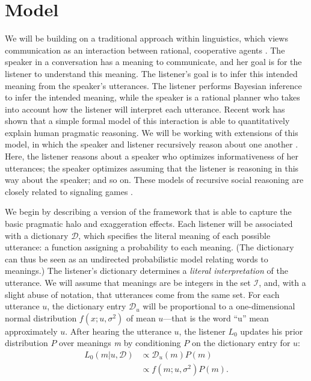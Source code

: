 \documentclass{article} %
\newcommand{\dictionary}{\ensuremath{\mathcal{D}}\xspace}
\begin{document}

\section{Model}

We will be building on a traditional approach within linguistics, which views communication as an interaction between rational, cooperative agents \cite{grice1975}. The speaker in a conversation has a meaning to communicate, and her goal is for the listener to understand this meaning. The listener's goal is to infer this intended meaning from the speaker's utterances. The listener performs Bayesian inference to infer the intended meaning, while the speaker is a rational planner who takes into account how the listener will interpret each utterance. 
Recent work \cite{frankgoodmanscience, goodmanstuhlmueller} has shown that a simple formal model of this interaction is able to quantitatively explain human pragmatic reasoning. We will be working with extensions of this model, in which the speaker and listener recursively reason about one another \cite{jager2009pragmatic, bergen2012, franke2009interpretation}. Here, the listener reasons about a speaker who optimizes informativeness of her utterances; the speaker optimizes assuming that the listener is reasoning in this way about the speaker; and so on. These models of recursive social reasoning are closely related to signaling games \cite{cho1987signaling, chen2008selecting}.

We begin by describing a version of the framework that is able to capture the basic pragmatic halo and exaggeration effects.
Each listener will be associated with a dictionary $\dictionary$, which specifies the literal meaning of each possible utterance: a function assigning a probability to each meaning. (The dictionary can thus be seen as an undirected probabilistic model relating words to meanings.) The listener's dictionary determines a \emph{literal interpretation} of the utterance. We will assume that meanings are be integers in the set $\mathcal{I}$, and, with a slight abuse of notation, that utterances come from the same set. For each utterance $u$, the dictionary entry $\dictionary_u$ will be proportional to a one-dimensional normal distribution $f(x;u,\sigma^2)$ of mean $u$---that is the word ``u'' mean approximately $u$. After hearing the utterance $u$, the listener $L_0$ updates his prior distribution $P$ over meanings \emph{m} by conditioning $P$ on the dictionary entry for $u$:
\begin{align}\label{eq:literallistener}
L_0(m | u, \dictionary) &\propto \dictionary_u(m)P(m) \\
&\propto f(m;u,\sigma^2)P(m).
\end{align}
\end{document}
